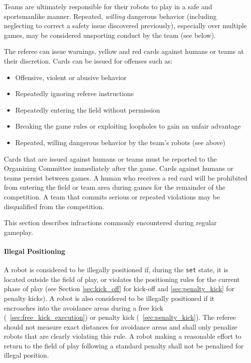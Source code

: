 Teams are ultimately responsible for their robots to play in a safe and sportsmanlike manner. Repeated, \textit{willing} dangerous behavior (including neglecting to correct a safety issue discovered previously), especially over multiple games, may be considered unsporting conduct by the team (see below).

\label{sec:penalties_against_humans}

The referee can issue warnings, yellow and red cards against humans or teams at their discretion. Cards can be issued for offenses such as:

\begin{itemize}
	\item Offensive, violent or abusive behavior
	\item Repeatedly ignoring referee instructions
	\item Repeatedly entering the field without permission
	\item Breaking the game rules or exploiting loopholes to gain an unfair advantage
	\item Repeated, willing dangerous behavior by the team's robots (see above)
\end{itemize}

Cards that are issued against humans or teams must be reported to the Organizing Committee immediately after the game. Cards against humans or teams persist between games. A human who receives a red card will be prohibited from entering the field or team area during games for the remainder of the competition. A team that commits serious or repeated violations may be disqualified from the competition. 

\label{sec:offenses}
This section describes infractions commonly encountered during regular gameplay. 

\paragraph{Illegal Positioning}
\label{sec:illegal_positioning}
A robot is considered to be illegally positioned if, during the \texttt{set} state, it is located outside the field of play, or violates the positioning rules for the current phase of play (see Section \ref{sec:kick_off} for kick-off and \ref{sec:penalty_kick} for penalty kicks). A robot is also considered to be illegally positioned if it encroaches into the avoidance areas during a free kick (\cf~\ref{sec:free_kick_execution}) or penalty kick (\cf~\ref{sec:penalty_kick}). The referee should not measure exact distances for  avoidance areas and shall only penalize robots that are clearly violating this rule. A robot making a reasonable effort to return to the field of play following a standard penalty shall not be penalized for illegal position.

